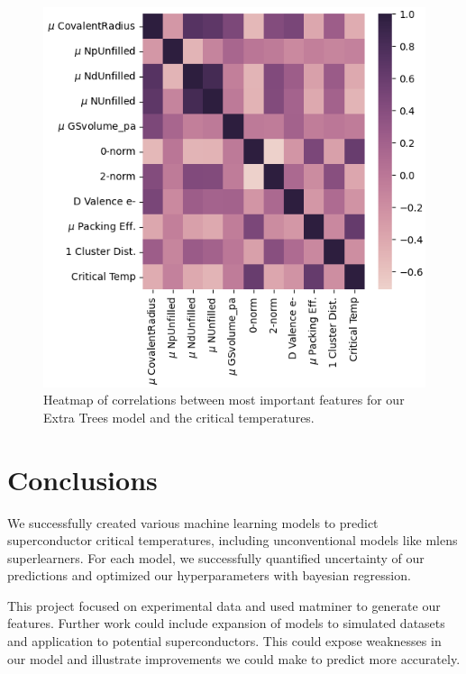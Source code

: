\documentclass[twocolumn, nofootinbib, secnumarabic, amssymb, nobibnotes, aps, prd]{revtex4-2}
\begin{document}
\begin{figure}[!h]
   \centering
   \includegraphics[width=\columnwidth]{images/feature_heatmap_eti.png}
   \caption{Heatmap of correlations between most important features for our Extra Trees model and the critical temperatures.}
   \label{fig:feature-correlations}
\end{figure}%

\section{Conclusions}
We successfully created various machine learning models to predict superconductor critical temperatures, including unconventional models like mlens superlearners. For each model, we successfully quantified uncertainty of our predictions and optimized our hyperparameters with bayesian regression. 

This project focused on experimental data and used matminer to generate our features. Further work could include expansion of models to simulated datasets and application to potential superconductors. This could expose weaknesses in our model and illustrate improvements we could make to predict more accurately.
\end{document}
